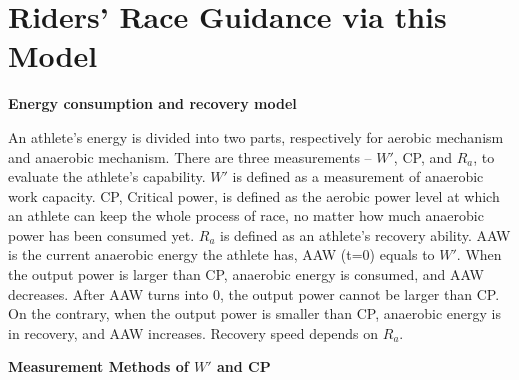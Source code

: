 \documentclass{mcmthesis}
\begin{document}
\section{Riders' Race Guidance via this Model}
\begin{spacing}{1.2}
\noindent \textbf{Energy consumption and recovery model}

An athlete's energy is divided into two parts, respectively for aerobic mechanism and anaerobic mechanism. There are three measurements – ${W}'$, CP, and $R_a$, to evaluate the athlete's capability.
${W}'$ is defined as a measurement of anaerobic work capacity.
CP, Critical power, is defined as the aerobic power level at which an athlete can keep the whole process of race, no matter how much anaerobic power has been consumed yet. 
$R_a$ is defined as an athlete's recovery ability.
AAW is the current anaerobic energy the athlete has, AAW (t=0) equals to ${W}'$.
When the output power is larger than CP, anaerobic energy is consumed, and AAW decreases. After AAW turns into 0, the output power cannot be larger than CP. On the contrary, when the output power is smaller than CP, anaerobic energy is in recovery, and AAW increases. Recovery speed depends on $R_a$.

\noindent \textbf{Measurement Methods of ${W}'$ and CP}


\end{spacing}
\end{document}
